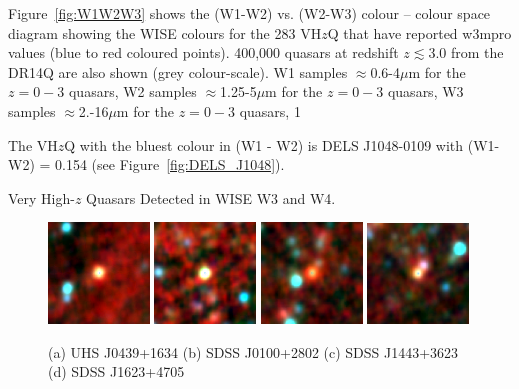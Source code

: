 \documentclass[usenatbib]{mnras}
\begin{document}
Figure~\ref{fig:W1W2W3} shows the (W1-W2) vs. (W2-W3) colour – colour
space diagram showing the WISE colours for the 283 VH$z$Q that have
reported w3mpro values (blue to red coloured points).  400,000 quasars
at redshift $z\lesssim3.0$ from the DR14Q are also shown (grey
colour-scale). 
W1 samples $\approx$0.6-4$\mu$m for the $z=0-3$ quasars, 
W2 samples $\approx$1.25-5$\mu$m for the $z=0-3$ quasars, 
W3 samples $\approx$2.-16$\mu$m for the $z=0-3$ quasars, 
1 

The VH$z$Q with the bluest colour in (W1 - W2) is 
DELS J1048-0109 with (W1-W2) = 0.154 
(see Figure~\ref{fig:DELS_J1048}).


Very High-$z$ Quasars Detected in WISE W3 and W4.


\begin{figure}
    \centering
    \includegraphics[width=0.24\textwidth]{../data/WISE/image_thumbnails/UHS_J0439+1634.png} 
    \includegraphics[width=0.24\textwidth]{../data/WISE/image_thumbnails/SDSS_J0100+2802.png}
    \includegraphics[width=0.24\textwidth]{../data/WISE/image_thumbnails/SDSS_J1443+3623.png}
    \includegraphics[width=0.24\textwidth]{../data/WISE/image_thumbnails/SDSS_J1623+4705.png}
    \caption{ (a) UHS J0439+1634 
                 (b) SDSS J0100+2802 
               (c) SDSS J1443+3623 
 (d) SDSS J1623+4705
}
    \label{fig:foobar}
\end{figure}
\end{document}
